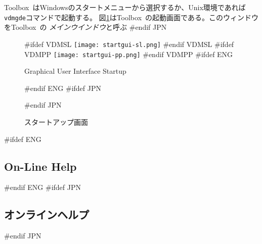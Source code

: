 \documentclass[\pformat,12pt]{article}
\newcommand{\Toolbox}{Toolbox}
\newcommand{\vdmgde}{vdmgde}
\newcommand{\Toolbox}{Toolbox}
\newcommand{\vdmgde}{vppgde}
\newcommand{\guicmd}[1]{{\sf #1}}
\newcommand{\guicmd}[1]{{\gt #1}}
\begin{document}
\Toolbox\ はWindowsのスタートメニューから選択するか、Unix環境であれば{\tt
  \vdmgde}コマンドで起動する。
図\ref{fig:startgui}は\Toolbox\ の起動画面である。このウィンドウを\Toolbox\ の
{\em メインウインドウ\/}と呼ぶ
#endif JPN

\begin{figure}[tbh]
\begin{center}
#ifdef VDMSL
\texttt{[image: startgui-sl.png]}
#endif VDMSL
#ifdef VDMPP
\texttt{[image: startgui-pp.png]}
#endif VDMPP
#ifdef ENG
\caption{Graphical User Interface Startup}
#endif ENG
#ifdef JPN
\caption{スタートアップ画面}
#endif JPN
\label{fig:startgui}
\end{center}
\end{figure}

#ifdef ENG
\subsection{On-Line Help}
#endif ENG
#ifdef JPN
\subsection{オンラインヘルプ}
#endif JPN
 
%


\end{document}
